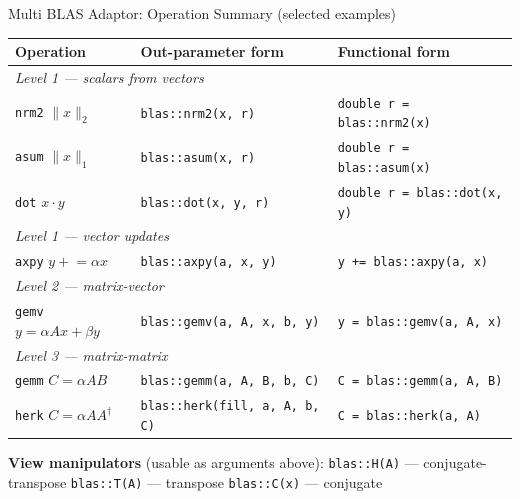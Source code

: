 \documentclass[t,aspectratio=169,handout]{beamer}
\begin{document}
\begin{frame}[label=blasops]{Multi BLAS Adaptor: Operation Summary (selected examples)}
\footnotesize
\setlength{\tabcolsep}{5pt}
\begin{tabular}{@{}lll@{}}
\hline
\textbf{Operation} & \textbf{Out-parameter form} & \textbf{Functional form} \\
\hline
\multicolumn{3}{l}{\textit{Level 1 --- scalars from vectors}} \\[2pt]
\texttt{nrm2} $\|x\|_2$  & \texttt{blas::nrm2(x, r)}        & \texttt{double r = blas::nrm2(x)} \\
\texttt{asum} $\|x\|_1$  & \texttt{blas::asum(x, r)}        & \texttt{double r = blas::asum(x)} \\
\texttt{dot}  $x \cdot y$ & \texttt{blas::dot(x, y, r)}     & \texttt{double r = blas::dot(x, y)} \\[4pt]
\multicolumn{3}{l}{\textit{Level 1 --- vector updates}} \\[2pt]
\texttt{axpy} $y \mathrel{+}= \alpha x$ & \texttt{blas::axpy(a, x, y)}    & \texttt{y += blas::axpy(a, x)} \\[4pt]
\multicolumn{3}{l}{\textit{Level 2 --- matrix-vector}} \\[2pt]
\texttt{gemv} $y = \alpha Ax + \beta y$          & \texttt{blas::gemv(a, A, x, b, y)} & \texttt{y = blas::gemv(a, A, x)} \\[4pt]
\multicolumn{3}{l}{\textit{Level 3 --- matrix-matrix}} \\[2pt]
\texttt{gemm} $C = \alpha AB$          & \texttt{blas::gemm(a, A, B, b, C)} & \texttt{C = blas::gemm(a, A, B)} \\
\texttt{herk} $C = \alpha A A^\dagger$ & \texttt{blas::herk(fill, a, A, b, C)} & \texttt{C = blas::herk(a, A)} \\
\hline
\end{tabular}

\medskip
{\footnotesize\textbf{View manipulators} (usable as arguments above):
\texttt{blas::H(A)} — conjugate-transpose \quad
\texttt{blas::T(A)} — transpose \quad
\texttt{blas::C(x)} — conjugate}
\end{frame}
\end{document}

